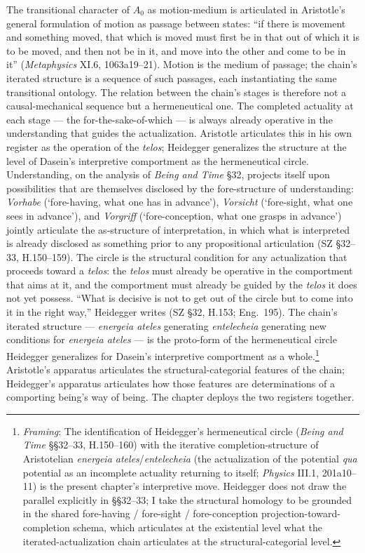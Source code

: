 \documentclass{article}
\begin{document}
The transitional character of $A_0$ as motion-medium is articulated in Aristotle's general formulation of motion as passage between states: ``if there is movement and something moved, that which is moved must first be in that out of which it is to be moved, and then not be in it, and move into the other and come to be in it'' (\textit{Metaphysics} XI.6, 1063a19--21). Motion is the medium of passage; the chain's iterated structure is a sequence of such passages, each instantiating the same transitional ontology. The relation between the chain's stages is therefore not a causal-mechanical sequence but a hermeneutical one. The completed actuality at each stage --- the for-the-sake-of-which --- is always already operative in the understanding that guides the actualization. Aristotle articulates this in his own register as the operation of the \textit{telos}; Heidegger generalizes the structure at the level of Dasein's interpretive comportment as the hermeneutical circle. Understanding, on the analysis of \textit{Being and Time} \S 32, projects itself upon possibilities that are themselves disclosed by the fore-structure of understanding: \textit{Vorhabe} (`fore-having, what one has in advance'), \textit{Vorsicht} (`fore-sight, what one sees in advance'), and \textit{Vorgriff} (`fore-conception, what one grasps in advance') jointly articulate the as-structure of interpretation, in which what is interpreted is already disclosed as something prior to any propositional articulation (SZ \S 32--33, H.150--159). The circle is the structural condition for any actualization that proceeds toward a \textit{telos}: the \textit{telos} must already be operative in the comportment that aims at it, and the comportment must already be guided by the \textit{telos} it does not yet possess. ``What is decisive is not to get out of the circle but to come into it in the right way,'' Heidegger writes (SZ \S 32, H.153; Eng.~195). The chain's iterated structure --- \textit{energeia ateles} generating \textit{entelecheia} generating new conditions for \textit{energeia ateles} --- is the proto-form of the hermeneutical circle Heidegger generalizes for Dasein's interpretive comportment as a whole.\footnote{\textit{Framing}: The identification of Heidegger's hermeneutical circle (\textit{Being and Time} §§32--33, H.150--160) with the iterative completion-structure of Aristotelian \textit{energeia ateles}/\textit{entelecheia} (the actualization of the potential \textit{qua} potential as an incomplete actuality returning to itself; \textit{Physics} III.1, 201a10--11) is the present chapter's interpretive move. Heidegger does not draw the parallel explicitly in §§32--33; I take the structural homology to be grounded in the shared fore-having / fore-sight / fore-conception projection-toward-completion schema, which articulates at the existential level what the iterated-actualization chain articulates at the structural-categorial level.} Aristotle's apparatus articulates the structural-categorial features of the chain; Heidegger's apparatus articulates how those features are determinations of a comporting being's way of being. The chapter deploys the two registers together.
\end{document}
